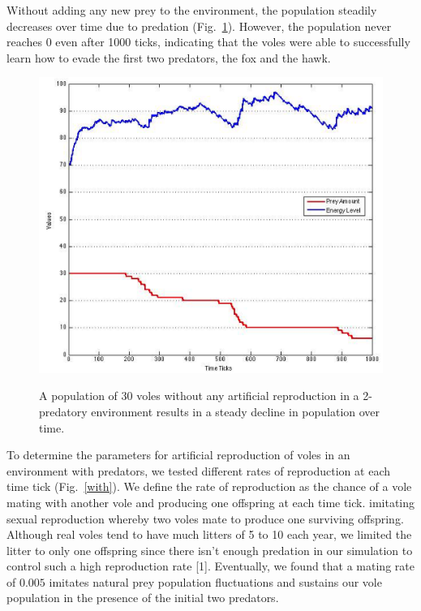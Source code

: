 \documentclass[10pt,conference,letterpaper,doublecolumn]{IEEEtran}
\begin{document}
Without adding any new prey to the environment, the population steadily decreases over time due to predation (Fig.~\ref{without}). However, the population never reaches 0 even after 1000 ticks, indicating that the voles were able to successfully learn how to evade the first two predators, the fox and the hawk.
\begin{figure}[H]
  \centering
  \includegraphics[scale=0.35]{without_mating.png} \\
  \caption{A population of 30 voles without any artificial reproduction in a 2-predatory environment results in a steady decline in population over time.}
  \label{without}
\end{figure}
To determine the parameters for artificial reproduction of voles in an environment with predators, we tested different rates of reproduction at each time tick (Fig.~\ref{with}). We define the rate of reproduction as the chance of a vole mating with another vole and producing one offspring at each time tick. imitating sexual reproduction whereby two voles mate to produce one surviving offspring. Although real voles tend to have much litters of 5 to 10 each year, we limited the litter to only one offspring since there isn't enough predation in our simulation to control such a high reproduction rate [1]. Eventually, we found that a mating rate of $0.005$ imitates natural prey population fluctuations and sustains our vole population in the presence of the initial two predators.
\end{document}
